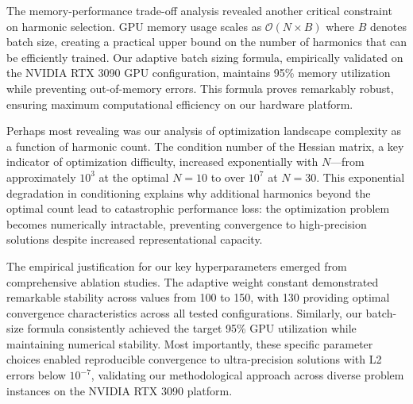 The memory-performance trade-off analysis revealed another critical constraint on harmonic selection. GPU memory usage scales as $\mathcal{O}(N \times B)$ where $B$ denotes batch size, creating a practical upper bound on the number of harmonics that can be efficiently trained. Our adaptive batch sizing formula, empirically validated on the NVIDIA RTX 3090 GPU configuration, maintains 95\% memory utilization while preventing out-of-memory errors. This formula proves remarkably robust, ensuring maximum computational efficiency on our hardware platform.

Perhaps most revealing was our analysis of optimization landscape complexity as a function of harmonic count. The condition number of the Hessian matrix, a key indicator of optimization difficulty, increased exponentially with $N$—from approximately $10^3$ at the optimal $N=10$ to over $10^7$ at $N=30$. This exponential degradation in conditioning explains why additional harmonics beyond the optimal count lead to catastrophic performance loss: the optimization problem becomes numerically intractable, preventing convergence to high-precision solutions despite increased representational capacity.

The empirical justification for our key hyperparameters emerged from comprehensive ablation studies. The adaptive weight constant demonstrated remarkable stability across values from 100 to 150, with 130 providing optimal convergence characteristics across all tested configurations. Similarly, our batch-size formula consistently achieved the target 95\% GPU utilization while maintaining numerical stability. Most importantly, these specific parameter choices enabled reproducible convergence to ultra-precision solutions with L2 errors below $10^{-7}$, validating our methodological approach across diverse problem instances on the NVIDIA RTX 3090 platform.

